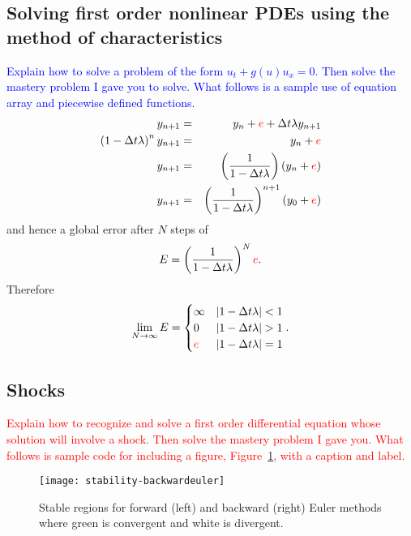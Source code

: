 \documentclass{article}
\newcommand{\bea}{\begin{eqnarray*}}
\newcommand{\eea}{\end{eqnarray*}}
\newcommand{\red}[1]{\textcolor{red}{#1}}
\newcommand{\blue}[1]{\textcolor{blue}{#1}}
\begin{document}
\subsection{Solving first order nonlinear PDEs using the method of characteristics}
\blue{Explain how to solve a problem of the form $u_t+g(u)u_x=0$. Then solve the mastery problem I gave you to solve. What follows is a sample use of equation array and piecewise defined functions.}
  \bea
y_{n+1} &=& y_n+\red{e} + \Delta t \lambda y_{n+1} \\
\left(1-\Delta t
\lambda\right)^ny_{n+1} &=& y_n+\red{e} \\
y_{n+1} &=& \left(\frac{1}{1-\Delta t \lambda}\right)(y_n+\red{e}) \\
y_{n+1} &=& \left(\frac{1}{1-\Delta t \lambda}\right)^{n+1}(y_0+\red{e}) 
\eea
and hence a global error after $N$ steps of
$$E = \left(\frac{1}{1-\Delta t \lambda}\right)^N\red{e}.$$ Therefore
$$\lim_{N\to \infty} E = \begin{cases} \infty & 
  |1-\Delta t \lambda|<1 \\
 0 &  |1-\Delta t \lambda|>1 \\
  \red{e} & |1-\Delta t \lambda|=1
  \end{cases}.$$
\subsection{Shocks}
\red{Explain how to recognize and solve a first order differential equation whose solution will involve a shock. Then solve the mastery problem I gave you. What follows is sample code for including a figure, Figure~\ref{fig:example}, with a caption and label.}
\begin{figure}[ht]
\begin{center}
  \texttt{[image: stability-backwardeuler]}
  \end{center}
\caption{Stable regions for forward (left) and backward (right) Euler methods where green is
  convergent and white is divergent. \label{fig:example}}
\end{figure}
\end{document}
